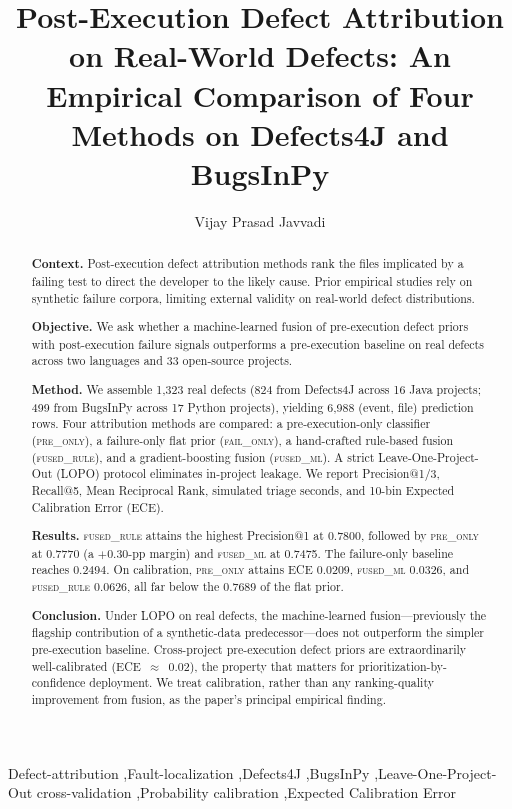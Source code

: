 \documentclass[preprint,12pt]{elsarticle}
\begin{document}
\begin{frontmatter}

\title{Post-Execution Defect Attribution on Real-World Defects: An Empirical Comparison of Four Methods on Defects4J and BugsInPy}

\author[1]{Vijay Prasad Javvadi}

\begin{abstract}
\noindent\textbf{Context.} Post-execution defect attribution methods rank the files implicated by a failing test to direct the developer to the likely cause. Prior empirical studies rely on synthetic failure corpora, limiting external validity on real-world defect distributions.

\noindent\textbf{Objective.} We ask whether a machine-learned fusion of pre-execution defect priors with post-execution failure signals outperforms a pre-execution baseline on real defects across two languages and 33 open-source projects.

\noindent\textbf{Method.} We assemble 1{,}323 real defects (824 from Defects4J across 16 Java projects; 499 from BugsInPy across 17 Python projects), yielding 6{,}988 (event, file) prediction rows. Four attribution methods are compared: a pre-execution-only classifier (\textsc{pre\_only}), a failure-only flat prior (\textsc{fail\_only}), a hand-crafted rule-based fusion (\textsc{fused\_rule}), and a gradient-boosting fusion (\textsc{fused\_ml}). A strict Leave-One-Project-Out (LOPO) protocol eliminates in-project leakage. We report Precision@1/3, Recall@5, Mean Reciprocal Rank, simulated triage seconds, and 10-bin Expected Calibration Error (ECE).

\noindent\textbf{Results.} \textsc{fused\_rule} attains the highest Precision@1 at 0.7800, followed by \textsc{pre\_only} at 0.7770 (a $+0.30$-pp margin) and \textsc{fused\_ml} at 0.7475. The failure-only baseline reaches 0.2494. On calibration, \textsc{pre\_only} attains ECE 0.0209, \textsc{fused\_ml} 0.0326, and \textsc{fused\_rule} 0.0626, all far below the 0.7689 of the flat prior.

\noindent\textbf{Conclusion.} Under LOPO on real defects, the machine-learned fusion---previously the flagship contribution of a synthetic-data predecessor---does not outperform the simpler pre-execution baseline. Cross-project pre-execution defect priors are extraordinarily well-calibrated (ECE~$\approx$~0.02), the property that matters for prioritization-by-confidence deployment. We treat calibration, rather than any ranking-quality improvement from fusion, as the paper's principal empirical finding.
\end{abstract}

\begin{keyword}
Defect-attribution \sep Fault-localization \sep Defects4J \sep BugsInPy \sep Leave-One-Project-Out cross-validation \sep Probability calibration \sep Expected Calibration Error
\end{keyword}

\end{frontmatter}
\end{document}
